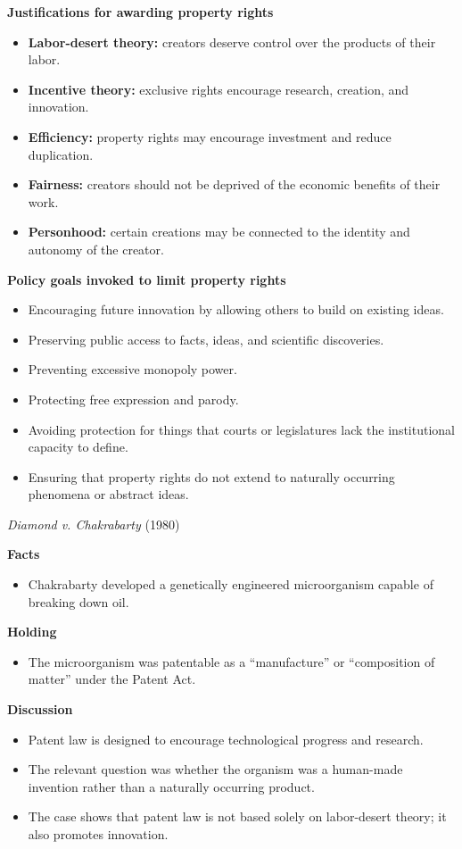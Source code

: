 \documentclass[11pt]{tex/lawoutline}
\begin{document}
\textbf{Justifications for awarding property rights}
{
\begin{itemize}
    \item \textbf{Labor-desert theory:} creators deserve control over the products of their labor.
    \item \textbf{Incentive theory:} exclusive rights encourage research, creation, and innovation.
    \item \textbf{Efficiency:} property rights may encourage investment and reduce duplication.
    \item \textbf{Fairness:} creators should not be deprived of the economic benefits of their work.
    \item \textbf{Personhood:} certain creations may be connected to the identity and autonomy of the creator.
\end{itemize}
}

\textbf{Policy goals invoked to limit property rights}
{
\begin{itemize}
    \item Encouraging future innovation by allowing others to build on existing ideas.
    \item Preserving public access to facts, ideas, and scientific discoveries.
    \item Preventing excessive monopoly power.
    \item Protecting free expression and parody.
    \item Avoiding protection for things that courts or legislatures lack the institutional capacity to define.
    \item Ensuring that property rights do not extend to naturally occurring phenomena or abstract ideas.
\end{itemize}
}

\casebox
{\textit{Diamond v. Chakrabarty} (1980)}
{}
{
\textbf{Facts}
\begin{itemize}
    \item Chakrabarty developed a genetically engineered microorganism capable of breaking down oil.
\end{itemize}

\textbf{Holding}
\begin{itemize}
    \item The microorganism was patentable as a ``manufacture'' or ``composition of matter'' under the Patent Act.
\end{itemize}

\textbf{Discussion}
\begin{itemize}
    \item Patent law is designed to encourage technological progress and research.
    \item The relevant question was whether the organism was a human-made invention rather than a naturally occurring product.
    \item The case shows that patent law is not based solely on labor-desert theory; it also promotes innovation.
\end{itemize}
}
\end{document}
